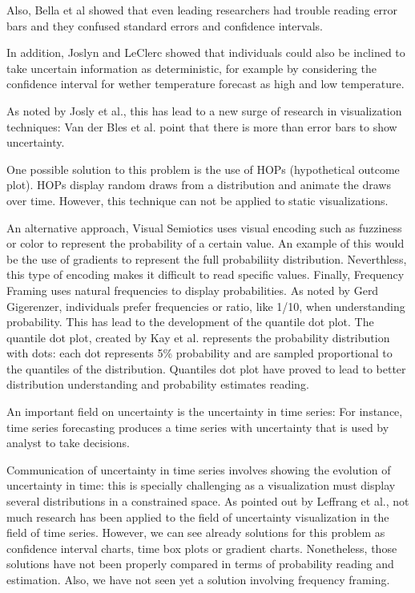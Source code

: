 \documentclass[a4paper,3p,sort&compress]{elsarticle}
\begin{document}
Also, Bella et al showed that even leading researchers had trouble reading error bars and they confused 
standard errors and confidence intervals. 

In addition, Joslyn and LeClerc showed that individuals could also be inclined to take uncertain 
information as deterministic, for example by considering the confidence interval for wether temperature 
forecast as high and low temperature. 

As noted by Josly et al., this has lead to a new surge of research in visualization techniques: Van 
der Bles et al. point that there is more than error bars to show uncertainty. 

One possible solution to this problem is the use of HOPs (hypothetical outcome plot). HOPs display 
random draws from a distribution and animate the draws over time. However, this technique can not be 
applied to static visualizations. 

An alternative approach, Visual Semiotics uses visual encoding such as fuzziness or color to represent 
the probability of a certain value. An example of this would be the use of gradients to represent the 
full probabiliity distribution. Neverthless, this type of encoding makes it difficult to read specific 
values. Finally, Frequency Framing uses natural frequencies to display probabilities. As noted by Gerd 
Gigerenzer, individuals prefer frequencies or ratio, like 1/10, when understanding probability. This has 
lead to the development of the quantile dot plot. The quantile dot plot, created by Kay et al. represents 
the probability distribution with dots: each dot represents 5\% probability and are sampled proportional 
to the quantiles of the distribution. Quantiles dot plot have proved to lead to better distribution 
understanding and probability estimates reading.

An important field on uncertainty is the uncertainty in time series: For instance, time series forecasting 
produces a time series with uncertainty that is used by analyst to take decisions.

Communication of uncertainty in time series involves showing the evolution of uncertainty in time: this 
is specially challenging as a visualization must display several distributions in a constrained space.  
As pointed out by Leffrang et al., not much research has been applied to the field of uncertainty visualization 
in the field of time series. However, we can see already solutions for this problem as confidence interval charts,
 time box plots or gradient charts. Nonetheless, those solutions have not been properly compared in terms of 
 probability reading and estimation. Also, we have not seen yet a solution involving frequency framing.
\end{document}
